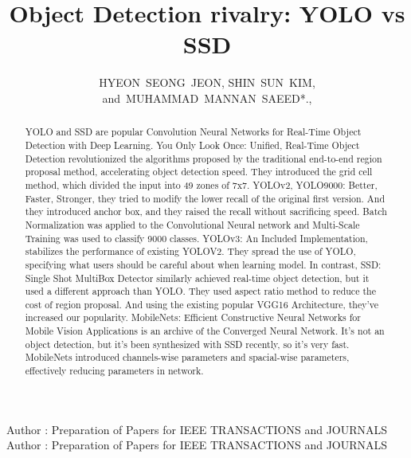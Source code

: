 \documentclass{ieeeaccess}
\begin{document}

\title{Object Detection rivalry: YOLO vs SSD}
\author{\uppercase{Hyeon~Seong~Jeon},
\uppercase {Shin~Sun~Kim}, {and~MUHAMMAD~MANNAN~SAEED*}.,
}
\address[1]{Artificial Intelligence, SungKyunKwan University, 16419, Suwon, South Korea (e-mail: cutz@skku.edu)}
\address[2]{Department of Electrical and Electronic Engineering, SungKyunKwan University, 16419, Suwon, South Korea (e-mail: ssk@skku.edu)}
\address[3]{Department of Electrical and Electronic Engineering, SungKyunKwan University, 16419, Suwon, South Korea (e-mail: mannan@skku.edu)}

\markboth
{Author \headeretal: Preparation of Papers for IEEE TRANSACTIONS and JOURNALS}
{Author \headeretal: Preparation of Papers for IEEE TRANSACTIONS and JOURNALS}


\begin{abstract}
YOLO and SSD are popular Convolution Neural Networks for Real-Time Object Detection with Deep Learning. You Only Look Once: Unified, Real-Time Object Detection revolutionized the algorithms proposed by the traditional end-to-end region proposal method, accelerating object detection speed. They introduced the grid cell method, which divided the input into 49 zones of 7x7. YOLOv2, YOLO9000: Better, Faster, Stronger, they tried to modify the lower recall of the original first version. And they introduced anchor box, and they raised the recall without sacrificing speed. Batch Normalization was applied to the Convolutional Neural network and Multi-Scale Training was used to classify 9000 classes. YOLOv3: An Included Implementation, stabilizes the performance of existing YOLOV2. They spread the use of YOLO, specifying what users should be careful about when learning model. In contrast, SSD: Single Shot MultiBox Detector similarly achieved real-time object detection, but it used a different approach than YOLO. They used aspect ratio method to reduce the cost of region proposal. And using the existing popular VGG16 Architecture, they've increased our popularity. MobileNets: Efficient Constructive Neural Networks for Mobile Vision Applications is an archive of the Converged Neural Network. It's not an object detection, but it's been synthesized with SSD recently, so it's very fast. MobileNets introduced channels-wise parameters and spacial-wise parameters, effectively reducing parameters in network.
\end{abstract}
\end{document}
